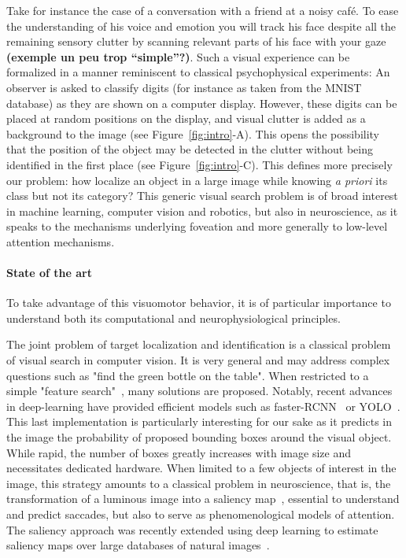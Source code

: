 Take for instance the case of a conversation with a friend at a noisy café. To ease the understanding of his voice and emotion you will track his face despite all the remaining sensory clutter by scanning relevant parts of his face with your gaze {\bf (exemple un peu trop ``simple''?)}. 
 Such a visual experience can be formalized in a manner reminiscent to classical psychophysical experiments: An observer is asked to classify digits (for instance as taken from the MNIST database) as they are shown on a computer display. However, these digits can be placed at random positions on the display, and visual clutter is added as a background to the image (see Figure~\ref{fig:intro}-A). This opens the possibility that the position of the object may be detected in the clutter without being identified in the first place  (see Figure~\ref{fig:intro}-C). This defines more precisely our problem: how  localize an object in a large image while knowing \emph{a priori} its class but not its category? This generic visual search problem is of broad  interest in machine learning, computer vision and robotics, but also in neuroscience, as it speaks to the mechanisms underlying foveation and more generally to low-level attention mechanisms.


\paragraph{State of the art}


To take advantage of this visuomotor behavior, it is of particular importance to understand both its computational and neurophysiological principles.

The joint problem of target localization and identification is a classical problem of visual search in computer vision. It is very general and may address complex questions such as "find the green bottle on the table". 
When restricted to a simple "feature search"~\citep{Treisman80}, many solutions are proposed. Notably, recent advances in deep-learning have provided  efficient models such as faster-RCNN~\citep{Ren17} or YOLO~\citep{Redmon15}. This last implementation is particularly interesting for our sake as it predicts in the image the probability of proposed bounding boxes around the visual object. While rapid, the number of boxes greatly increases with image size and necessitates dedicated hardware. 
When limited to a few objects of interest in the image, this strategy amounts to a classical problem in neuroscience, that is, the transformation of a luminous image into a saliency map~\citep{Itti01}, essential to understand and predict saccades, but also to serve as phenomenological models of attention. The saliency approach was recently extended using deep learning  to estimate saliency maps over large databases of natural images~\citep{Kummerer16}. 

